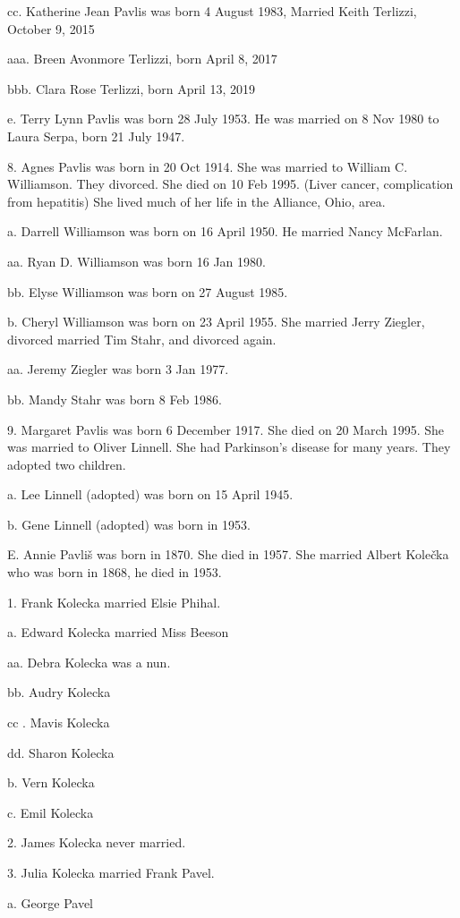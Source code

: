 \documentclass[a4paper]{article}
\begin{document}
cc. Katherine Jean Pavlis was born 4 August 1983, Married Keith Terlizzi, October 9, 2015

aaa. Breen Avonmore Terlizzi, born April 8, 2017

bbb. Clara Rose Terlizzi, born April 13, 2019

e. Terry Lynn Pavlis was born 28 July 1953.  He was married on 8 Nov 1980 to Laura Serpa, born 21 July 1947.  

8. Agnes Pavlis was born in 20 Oct 1914.  She was married to William C. Williamson.  They divorced.  She died on 10 Feb 1995.  (Liver cancer, complication from hepatitis)  She lived much of her life in the Alliance, Ohio, area.

a. Darrell Williamson was born on 16 April 1950.  He married Nancy McFarlan.

aa. Ryan D. Williamson was born 16 Jan 1980.

bb. Elyse Williamson was born on 27 August 1985.

b. Cheryl Williamson was born on 23 April 1955.  She married Jerry Ziegler, divorced married Tim Stahr, and divorced again.

aa. Jeremy Ziegler was born 3 Jan 1977.

bb. Mandy Stahr was born 8 Feb 1986.

9. Margaret Pavlis was born 6 December 1917.  She died on 20 March 1995. She was married to Oliver Linnell.  She had Parkinson's disease for many years. They adopted two children.
			
a. Lee Linnell (adopted) was born on 15 April 1945.

b. Gene Linnell (adopted) was born in 1953.   

E. Annie Pavli\v{s} was born in 1870.  She died in 1957.  She married Albert Kole\v{c}ka who was born in 1868, he died in 1953.

1. Frank Kolecka married Elsie Phihal.

a. Edward Kolecka married Miss Beeson

aa. Debra Kolecka was a nun.

bb. Audry Kolecka

cc . Mavis Kolecka

dd. Sharon Kolecka

b. Vern Kolecka

c. Emil Kolecka 

2. James Kolecka never married.

3. Julia Kolecka married Frank Pavel.

a. George Pavel
\end{document}
